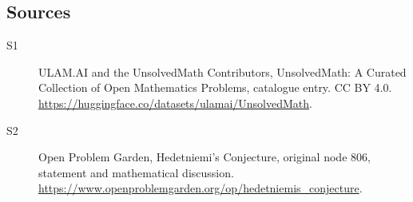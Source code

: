 \documentclass[11pt]{article}
\begin{document}
\subsection{Sources}
\begin{description}
\item[\hypertarget{source:statement:1}{S1}] ULAM.AI and the UnsolvedMath Contributors, UnsolvedMath: A Curated Collection of Open Mathematics Problems, catalogue entry. CC BY 4.0. \url{https://huggingface.co/datasets/ulamai/UnsolvedMath}.
\item[\hypertarget{source:statement:2}{S2}] Open Problem Garden, Hedetniemi's Conjecture, original node 806, statement and mathematical discussion. \url{https://www.openproblemgarden.org/op/hedetniemis_conjecture}.
\end{description}
\label{end:statement}
\end{document}
